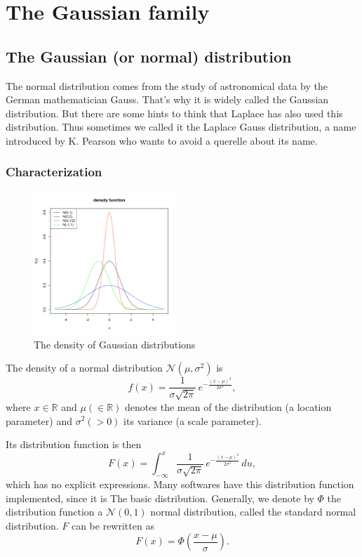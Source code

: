 \chapter{The Gaussian family}
\section{The Gaussian (or normal) distribution}


The normal distribution comes from the study of astronomical data by the German mathematician Gauss. That's why it is widely called the Gaussian distribution. But there are some hints to think that Laplace has also used this distribution. Thus sometimes we called it the Laplace Gauss distribution, a name introduced by K. Pearson who wants to avoid a querelle about its name.


\subsection{Characterization}
\begin{figure}
  \begin{center}
    \includegraphics[width=0.48\textwidth]{img/normzoom}
  \end{center}
  \caption{The density of Gaussian distributions}
\end{figure}

The density of a normal distribution $\mathcal N(\mu, \sigma^2)$ is 
$$
f(x) =  \frac{1}{\sigma\sqrt{2\pi}} \,e^{ -\frac{(x- \mu)^2}{2\sigma^2}},
$$
where $x\in \mathbb R$ and $\mu (\in \mathbb R)$ denotes the mean of the distribution (a location parameter) and $\sigma^2 (>0)$ its variance (a scale parameter).



Its distribution function is then
$$
F(x) = \int_{-\infty}^x \frac{1}{\sigma\sqrt{2\pi}} \,e^{ -\frac{(x- \mu)^2}{2\sigma^2}} \,du,
$$
which has no explicit expressions. Many softwares have this distribution function implemented, since it is The basic distribution. Generally, we denote by $\Phi$ the distribution function a $\mathcal N(0, 1)$ normal distribution, called the standard normal distribution. $F$ can be rewritten as
$$
F(x) = \Phi\left(\frac{x-\mu}{\sigma}\right).
$$

